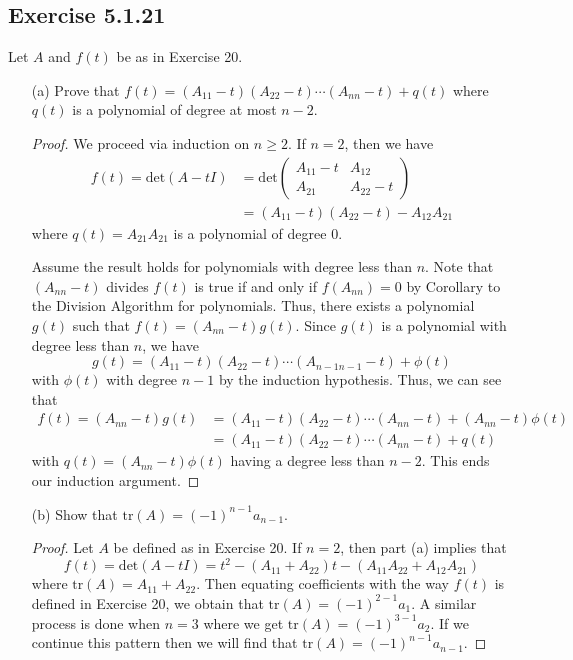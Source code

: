 \subsection*{Exercise 5.1.21} Let \( A  \) and \( f(t)  \) be as in Exercise 20.
\begin{enumerate} %
    \item[(a)] Prove that \( f(t) = ({A}_{11} - t)({A}_{22} - t) \cdots ({A}_{n n } - t) + q(t) \) where \( q(t) \) is a polynomial of degree at most \( n - 2  \). 
        \begin{proof}
        We proceed via induction on \( n \geq 2  \). If \( n = 2  \), then we have
        \begin{align*}
            f(t) = \text{det}(A - t I ) &= \text{det} \begin{pmatrix} 
                {A}_{11} - t & {A}_{12} \\
                {A}_{21} & {A}_{22} - t 
                      \end{pmatrix}  \\
                                        &= ({A}_{11} -t)({A}_{22} - t) - {A}_{12} {A}_{21}
        \end{align*}
        where \( q(t) = {A}_{21} {A}_{21} \) is a polynomial of degree \( 0  \).

        Assume the result holds for polynomials with degree less than \( n \). Note that \( ({A}_{n n  } - t ) \) divides \( f(t)  \) is true if and only if \( f({A}_{n n}) = 0  \) by Corollary to the Division Algorithm for polynomials. Thus, there exists a polynomial \( g(t)  \) such that \( f(t) = ({A}_{n n } - t)g(t) \).
Since \( g(t)  \) is a polynomial with degree less than \( n  \), we have
        \[  g(t) = ({A}_{11} - t)({A}_{22} - t) \cdots ({A}_{n-1 n-1} - t) + \phi(t) \]
        with \( \phi(t) \) with degree \( n -1  \) by the induction hypothesis. Thus, we can see that
        \begin{align*}
            f(t) = ({A}_{n n } - t)g(t)  
                 &= ({A}_{11} - t)({A}_{22} -t)\cdots({A}_{n n } -t) + ({A}_{n n } - t) \phi(t) \\
                 &=  ({A}_{11} - t)({A}_{22} -t)\cdots({A}_{n n } -t) + q(t) 
        \end{align*}
        with \( q(t) = ({A}_{n n } - t)\phi(t)  \) having a degree less than \( n -2  \). This ends our induction argument.
        \end{proof}
    \item[(b)] Show that \( \text{tr}(A) = (-1)^{n-1} {a}_{n-1} \).
        \begin{proof}
        Let \( A  \) be defined as in Exercise 20. If \( n = 2  \), then part (a) implies that 
        \[  f(t) = \text{det}(A - t I) = t^{2} - ({A}_{11} + {A}_{22})t - ({A}_{11} {A}_{22} + {A}_{12} {A}_{21}) \]
        where \( \text{tr}(A) = {A}_{11} + {A}_{22} \). Then equating coefficients with the way \( f(t) \) is defined in Exercise 20, we obtain that \( \text{tr}(A) = (-1)^{2-1} {a}_{1} \). A similar process is done when \( n = 3  \) where we get \( \text{tr}(A) = (-1)^{3-1} {a}_{2} \). If we continue this pattern then we will find that \( \text{tr}(A) = (-1)^{n-1}{a}_{n-1} \).


\end{proof}
\end{enumerate}

